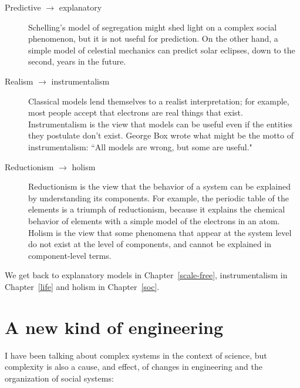 \documentclass[10pt]{book}
\begin{document}
\begin{description}

\item[Predictive $\rightarrow$ explanatory] Schelling's model
of segregation might shed light on a complex social phenomenon, but
it is not useful for prediction.  On the other hand, a simple model
of celestial mechanics can predict solar eclipses, down to the second,
years in the future.

\item[Realism $\rightarrow$ instrumentalism] Classical models lend
  themselves to a realist interpretation; for example, most people
  accept that electrons are real things that exist.  Instrumentalism
  is the view that models can be useful even if the entities they
  postulate don't exist.  George Box wrote what might be the motto of
  instrumentalism: ``All models are wrong, but some are useful."

\item[Reductionism $\rightarrow$ holism] Reductionism is the view that
  the behavior of a system can be explained by understanding its
  components.  For example, the periodic table of the elements is a
  triumph of reductionism, because it explains the chemical behavior
  of elements with a simple model of the electrons in an atom.  Holism
  is the view that some phenomena that appear at the system level do
  not exist at the level of components, and cannot be explained in
  component-level terms.

\end{description}

We get back to explanatory models in Chapter~\ref{scale-free},
instrumentalism in Chapter~\ref{life} and holism in Chapter~\ref{soc}.


\section{A new kind of engineering}

I have been talking about complex systems in the context of science,
but complexity is also a cause, and effect, of
changes in engineering and the organization of social
systems:
\end{document}
